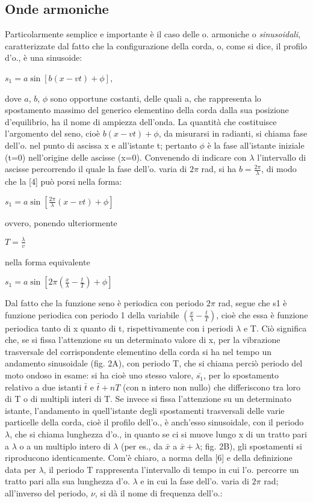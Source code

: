 \documentclass[a4paper]{article}
\begin{document}
\subsection{Onde armoniche}
Particolarmente semplice e importante è il caso delle o. armoniche o \textit{sinusoidali}, caratterizzate dal fatto che la configurazione della corda, o, come si dice, il profilo d'o., è una sinusoide: 

$s_1=a\sin [b(x-vt)+\phi]$,

dove $a$, $b$, $\phi$ sono opportune costanti, delle quali a, che rappresenta lo spostamento massimo del generico elementino della corda dalla sua posizione d’equilibrio, ha il nome di ampiezza dell’onda. La quantità che costituisce l’argomento del seno, cioè $b(x-vt)+ \phi$, da misurarsi in radianti, si chiama fase dell’o. nel punto di ascissa x e all’istante t; pertanto $\phi$ è la fase all’istante iniziale (t=0) nell’origine delle ascisse (x=0). Convenendo di indicare con $\lambda$ l’intervallo di ascisse percorrendo il quale la fase dell’o. varia di $2\pi$ rad, si ha $b=\frac{2\pi}{\lambda}$, di modo che la [4] può porsi nella forma: 

$s_1=a\sin [\frac{2\pi}{\lambda}(x-vt)+\phi]$

ovvero, ponendo ulteriormente 

$T=\frac{\lambda}{v}$

nella forma equivalente 

$s_1=a\sin [2\pi(\frac{x}{\lambda}-\frac{t}{T})+\phi]$

Dal fatto che la funzione seno è periodica con periodo $2\pi$ rad, segue che s1 è funzione periodica con periodo 1 della variabile $(\frac{x}{\lambda}-\frac{t}{T})$, cioè che essa è funzione periodica tanto di x quanto di t, rispettivamente con i periodi $\lambda$ e T. Ciò significa che, se si fissa l’attenzione su un determinato valore di x, per la vibrazione trasversale del corrispondente elementino della corda si ha nel tempo un andamento sinusoidale (fig. 2A), con periodo T, che si chiama perciò periodo del moto ondoso in esame: si ha cioè uno stesso valore, $\bar{s_1}$, per lo spostamento relativo a due istanti $\bar{t}$ e $\bar{t} + nT$ (con n intero non nullo) che differiscono tra loro di T o di multipli interi di T. Se invece si fissa l’attenzione su un determinato istante, l’andamento in quell’istante degli spostamenti trasversali delle varie particelle della corda, cioè il profilo dell’o., è anch’esso sinusoidale, con il periodo $\lambda$, che si chiama lunghezza d’o., in quanto se ci si muove lungo x di un tratto pari a $\lambda$ o a un multiplo intero di $\lambda$ (per es., da $\bar{x}$ a $\bar{x}+\lambda$; fig. 2B), gli spostamenti si riproducono identicamente. Com’è chiaro, a norma della [6] e della definizione data per $\lambda$, il periodo T rappresenta l’intervallo di tempo in cui l’o. percorre un tratto pari alla sua lunghezza d’o. $\lambda$ e in cui la fase dell’o. varia di $2\pi$ rad; all’inverso del periodo, $\nu$, si dà il nome di frequenza dell’o.: 
\end{document}
